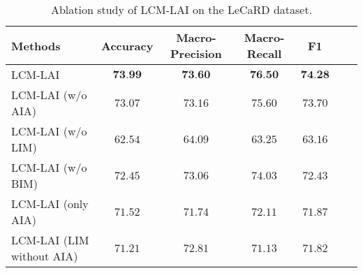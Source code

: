 \begin{table}[t]
\centering
\caption{Ablation study of LCM-LAI on the LeCaRD dataset.}\label{tab: Ablation Study}
\begin{tabular}{lcccccc}
\toprule
 Methods            & Accuracy      & Macro-Precision       & Macro-Recall      & F1         \\
 \midrule
 LCM-LAI            & $\textbf{73.99}$       & $\textbf{73.60}$       & $\textbf{76.50}$       & $\textbf{74.28}$     \\

 LCM-LAI (w/o AIA)  & $73.07$       & $73.16$       & $75.60$       & $73.70$     \\

 LCM-LAI (w/o LIM)  & $62.54$       & $64.09$       & $63.25$       & $63.16$     \\

 LCM-LAI (w/o BIM)  & $72.45$       & $73.06$       & $74.03$       & $72.43$     \\
 
 LCM-LAI (only AIA) & $71.52$       & $71.74$       & $72.11$       & $71.87$     \\

 LCM-LAI (LIM without AIA) & $ 71.21 $       & $ 72.81 $       & $ 71.13 $       & $ 71.82 $     \\
\bottomrule
\end{tabular}%
\end{table}

